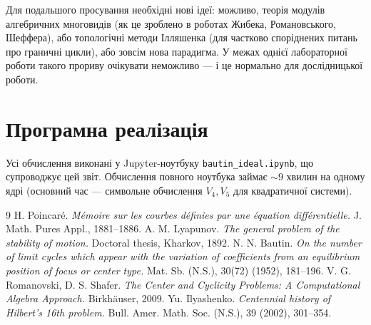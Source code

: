 \documentclass[12pt,a4paper]{article}
\begin{document}
Для подальшого просування необхідні нові ідеї: можливо, теорія модулів алгебричних многовидів (як це зроблено в роботах Жибека, Романовського, Шеффера), або топологічні методи Ілляшенка (для частково споріднених питань про граничні цикли), або зовсім нова парадигма. У межах однієї лабораторної роботи такого прориву очікувати неможливо --- і це нормально для дослідницької роботи.

\section*{Програмна реалізація}

Усі обчислення виконані у Jupyter-ноутбуку \texttt{bautin\_ideal.ipynb}, що супроводжує цей звіт. Обчислення повного ноутбука займає $\sim 9$ хвилин на одному ядрі (основний час --- символьне обчислення $V_4, V_5$ для квадратичної системи).

\begin{thebibliography}{9}
 H. Poincar\'e. \emph{M\'emoire sur les courbes d\'efinies par une \'equation diff\'erentielle.} J. Math. Pures Appl., 1881--1886.
 A. M. Lyapunov. \emph{The general problem of the stability of motion.} Doctoral thesis, Kharkov, 1892.
 N. N. Bautin. \emph{On the number of limit cycles which appear with the variation of coefficients from an equilibrium position of focus or center type.} Mat. Sb. (N.S.), 30(72) (1952), 181--196.
 V. G. Romanovski, D. S. Shafer. \emph{The Center and Cyclicity Problems: A Computational Algebra Approach.} Birkh\"auser, 2009.
 Yu. Ilyashenko. \emph{Centennial history of Hilbert's 16th problem.} Bull. Amer. Math. Soc. (N.S.), 39 (2002), 301--354.
\end{thebibliography}
\end{document}

